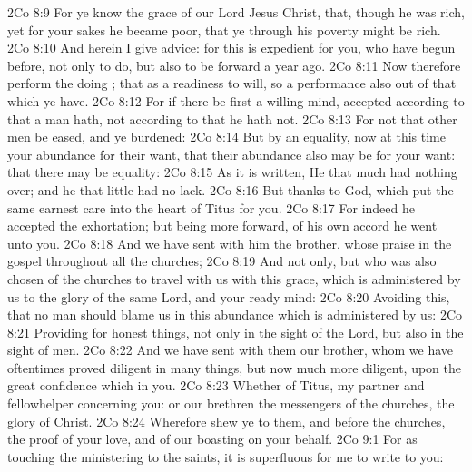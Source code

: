 \vs 2Co 8:9 For ye know the grace of our Lord Jesus Christ, that, though he was rich, yet for your sakes he became poor, that ye through his poverty might be rich.
\vs 2Co 8:10 And herein I give  advice: for this is expedient for you, who have begun before, not only to do, but also to be forward a year ago.
\vs 2Co 8:11 Now therefore perform the doing ; that as  a readiness to will, so  a performance also out of that which ye have.
\vs 2Co 8:12 For if there be first a willing mind,  accepted according to that a man hath,  not according to that he hath not.
\vs 2Co 8:13 For  not that other men be eased, and ye burdened:
\vs 2Co 8:14 But by an equality,  now at this time your abundance  for their want, that their abundance also may be  for your want: that there may be equality:
\vs 2Co 8:15 As it is written, He that  much had nothing over; and he that  little had no lack.
\vs 2Co 8:16 But thanks  to God, which put the same earnest care into the heart of Titus for you.
\vs 2Co 8:17 For indeed he accepted the exhortation; but being more forward, of his own accord he went unto you.
\vs 2Co 8:18 And we have sent with him the brother, whose praise  in the gospel throughout all the churches;
\vs 2Co 8:19 And not  only, but who was also chosen of the churches to travel with us with this grace, which is administered by us to the glory of the same Lord, and  your ready mind:
\vs 2Co 8:20 Avoiding this, that no man should blame us in this abundance which is administered by us:
\vs 2Co 8:21 Providing for honest things, not only in the sight of the Lord, but also in the sight of men.
\vs 2Co 8:22 And we have sent with them our brother, whom we have oftentimes proved diligent in many things, but now much more diligent, upon the great confidence which  in you.
\vs 2Co 8:23 Whether  of Titus,  my partner and fellowhelper concerning you: or our brethren  the messengers of the churches,  the glory of Christ.
\vs 2Co 8:24 Wherefore shew ye to them, and before the churches, the proof of your love, and of our boasting on your behalf.
\vs 2Co 9:1 For as touching the ministering to the saints, it is superfluous for me to write to you:
